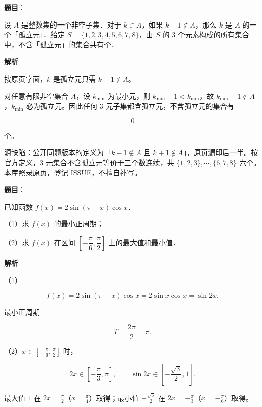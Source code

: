 \begin{answer}

\textbf{题目}：

设 $A$ 是整数集的一个非空子集．对于 $k\in A$，如果 $k-1\notin A$，那么 $k$ 是 $A$ 的一个「孤立元」．给定 $S=\{1,2,3,4,5,6,7,8\}$，由 $S$ 的 $3$ 个元素构成的所有集合中，不含「孤立元」的集合共有\gkblank{}个．

\textbf{解析}

按原页字面，$k$ 是孤立元只需 $k-1\notin A$。

对任意有限非空集合 $A$，设 $k_{\min}$ 为最小元，则 $k_{\min}-1<k_{\min}$，故 $k_{\min}-1\notin A$，$k_{\min}$ 必为孤立元。因此任何 3 元子集都含孤立元，不含孤立元的集合有

\nopagebreak[4]
\[0\]

个。

\begin{gktip}
源缺陷：公开同题版本的定义为「$k-1\notin A$ 且 $k+1\notin A$」，原页漏印后一半。按官方定义，3 元集合不含孤立元等价于三个数连续，共 $\{1,2,3\},\cdots,\{6,7,8\}$ 六个。本库照录原页，登记 ISSUE，不擅自补写。
\end{gktip}


\end{answer}
\begin{answer}

\textbf{题目}：

已知函数 $f(x)=2\sin(\pi-x)\cos x$．

（1）求 $f(x)$ 的最小正周期；

（2）求 $f(x)$ 在区间 $\left[-\dfrac{\pi}{6},\dfrac{\pi}{2}\right]$ 上的最大值和最小值．

\textbf{解析}

（1）

\nopagebreak[4]
\[f(x)=2\sin(\pi-x)\cos x=2\sin x\cos x=\sin2x .\]

最小正周期

\nopagebreak[4]
\[T=\frac{2\pi}{2}=\pi .\]

（2）$x\in\left[-\frac\pi6,\frac\pi2\right]$ 时，

\nopagebreak[4]
\[2x\in\left[-\frac\pi3,\pi\right],\qquad \sin2x\in\left[-\frac{\sqrt3}{2},1\right].\]

最大值 $1$ 在 $2x=\frac\pi2$（$x=\frac\pi4$）取得；最小值 $-\frac{\sqrt3}{2}$ 在 $2x=-\frac\pi3$（$x=-\frac\pi6$）取得。


\end{answer}
